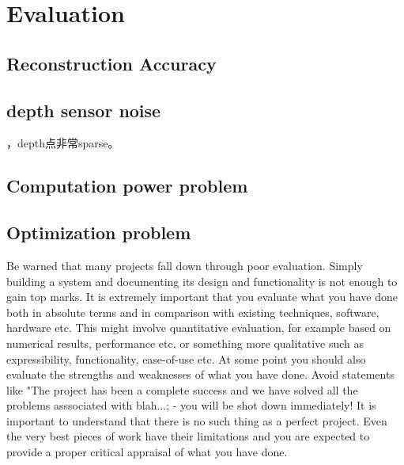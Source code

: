 \documentclass[12pt,twoside]{article}
\begin{document}
\newpage


\section{Evaluation}


\subsection{Reconstruction Accuracy}








\subsection{depth sensor noise}

，depth点非常sparse。








\subsection{Computation power problem}











\subsection{Optimization problem}

Be warned that many projects fall down through poor evaluation. Simply building a system and documenting its design and functionality is not enough to gain top marks. It is extremely important that you evaluate what you have done both in absolute terms and in comparison with existing techniques, software, hardware etc. This might involve quantitative evaluation, for example based on numerical results, performance etc. or something more qualitative such as expressibility, functionality, ease-of-use etc. At some point you should also evaluate the strengths and weaknesses of what you have done. Avoid statements like "The project has been a complete success and we have solved all the problems asssociated with blah...; - you will be shot down immediately! It is important to understand that there is no such thing as a perfect project. Even the very best pieces of work have their limitations and you are expected to provide a proper critical appraisal of what you have done.\\
\end{document}
